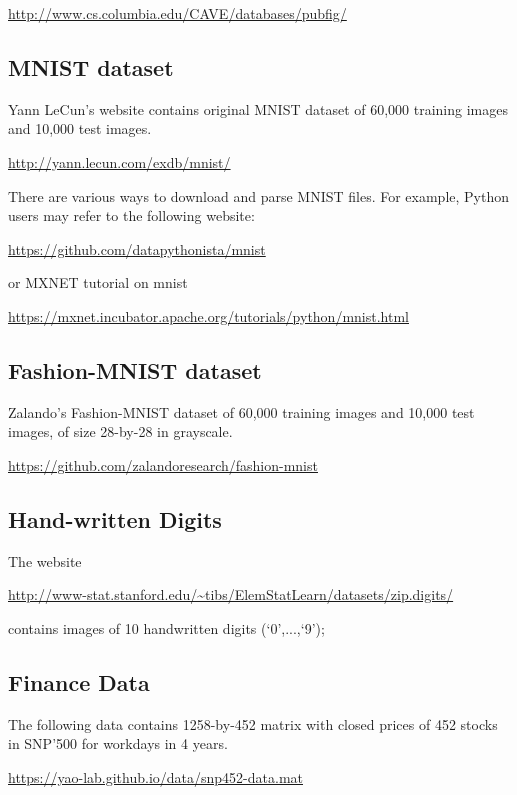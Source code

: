 \documentclass[11pt]{article}
\begin{document}
\url{http://www.cs.columbia.edu/CAVE/databases/pubfig/}

\subsection{MNIST dataset }

Yann LeCun's website contains original MNIST dataset of 60,000 training images and 10,000 test images. 

\url{http://yann.lecun.com/exdb/mnist/}

There are various ways to download and parse MNIST files. For example, Python users may refer to the following website:

\url{https://github.com/datapythonista/mnist}

or MXNET tutorial on mnist

\url{https://mxnet.incubator.apache.org/tutorials/python/mnist.html}

\subsection{Fashion-MNIST dataset}

Zalando's Fashion-MNIST dataset of 60,000 training images and 10,000 test images, of size 28-by-28 in grayscale. 

\url{https://github.com/zalandoresearch/fashion-mnist}




\subsection{Hand-written Digits} The website 

\url{http://www-stat.stanford.edu/\~tibs/ElemStatLearn/datasets/zip.digits/}

\noindent contains images of 10 handwritten digits (`$0$',...,`9');

\subsection{Finance Data}
The following data contains 1258-by-452 matrix with closed prices of 452 stocks in SNP'500 for workdays in 4 years.

\url{https://yao-lab.github.io/data/snp452-data.mat}
\end{document}
